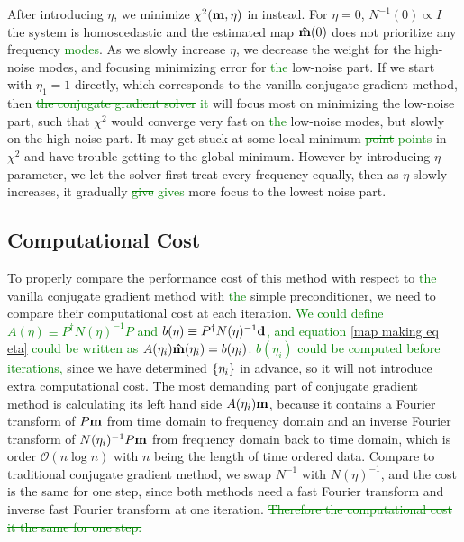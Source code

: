 \documentclass[twocolumn,linenumbers]{aastex631}
\newcommand{\Eq}[1]{\text{Eq.\,\ref{#1}}}
\newcommand{\vbd}{\vb{d}}
\newcommand{\vbm}{\vb{m}}
\newcommand{\inv}[1]{#1^{-1}}
\newcommand{\hatm}{\vb{\hat{m}}}
\newcommand{\Pdagger}{P^{\dagger}}
\newcommand{\textgreen}[1]{\textcolor{green}{#1}}
\begin{document}
After introducing $\eta$, we minimize
$\chi^2(\vbm,\eta)$ in \Eq{chi2 eta formula} instead.
For $\eta=0$, $N^{-1}(0) \propto I$ the system is homoscedastic and the estimated map $\hatm(0)$
does not prioritize any frequency \textgreen{modes}.
As we slowly increase $\eta$, we decrease the weight for the high-noise modes,
and focusing minimizing error for \textgreen{the} low-noise part.
If we start with $\eta_1=1$ directly, which corresponds to the vanilla conjugate
gradient method, then \textgreen{\sout{the conjugate gradient solver} it}
will focus most on minimizing the low-noise part, such that $\chi^2$ would
converge very fast on \textgreen{the} low-noise modes, but slowly on the high-noise part.
It may get stuck at some local minimum \textgreen{\sout{point} points} in $\chi^2$ and have trouble getting to the global minimum.
However by introducing $\eta$ parameter, we let the solver first treat every
frequency equally,
then as $\eta$ slowly increases, it gradually \textgreen{\sout{give} gives} more focus to the lowest noise part.


\subsection{Computational Cost}
To properly compare the performance cost of this method with respect to \textgreen{the} vanilla
conjugate gradient method with \textgreen{the} simple preconditioner,
we need to compare their computational cost at each iteration.
\textgreen{
We could define $A(\eta) \equiv \Pdagger \inv{N(\eta)} P$ and $b(\eta) \equiv \Pdagger \inv{N(\eta)} \vbd$,
and equation \ref{map making eq eta} could be written as $A(\eta_i) \hatm(\eta_i) = b(\eta_i)$.
$b(\eta_i)$ could be computed before iterations,
}
since we have determined $\qty{\eta_i}$ in advance,
so it will not introduce extra computational cost.
The most demanding part of conjugate gradient method is calculating
its left hand side $A(\eta_i) \vbm$, because it contains a Fourier transform of
$P\vbm$ from time domain to frequency domain and an inverse Fourier transform
of $\inv{N(\eta_i)} P \vbm$ from frequency domain back to time domain,
which is order $\mathcal{O}(n\log n)$ with $n$ being the length of time ordered
data.
Compare to traditional conjugate gradient method,
we swap $\inv{N}$ with $\inv{N(\eta)}$, and the cost is the same for one step,
since both methods need a fast Fourier transform and inverse fast Fourier transform 
at one iteration.
\textgreen{\sout{Therefore the computational cost it the same for one step.}}
\end{document}
